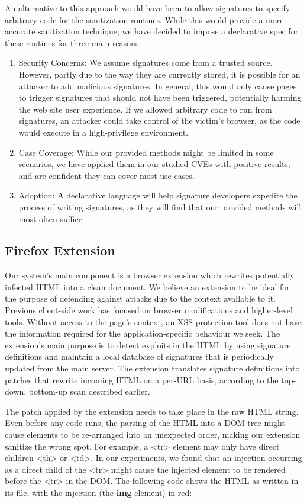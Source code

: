  An alternative to this approach would have been to allow signatures to specify arbitrary code for the sanitization routines. While this would provide a more accurate sanitization technique, we have decided to impose a declarative spec for these routines for three main reasons:
\begin{enumerate} 
	\item Security Concerns: We assume signatures come from a trusted source. However, partly due to the way they are currently stored, it is possible for an attacker to add malicious signatures. In general, this would only cause pages to trigger signatures that should not have been triggered, potentially harming the web site user experience. If we allowed arbitrary code to run from signatures, an attacker could take control of the victim's browser, as the code would execute in a high-privilege environment.
	\item Case Coverage: While our provided methods might be limited in some scenarios, we have applied them in our studied CVEs with positive results, and are confident they can cover most use cases.
	\item Adoption: A declarative language will help signature developers expedite the process of writing signatures, as they will find that our provided methods will most often suffice.
\end{enumerate}
 
 \subsection{Firefox Extension} \label{firefox_extension}
 Our system's main component is a browser extension which rewrites potentially infected HTML into a clean document. We believe an extension to be ideal for the purpose of defending against attacks due to the context available to it. Previous client-side work has focused on browser modifications and higher-level tools. Without access to the page's context, an XSS protection tool does not have the information required for the application-specific behaviour we seek. The extension's main purpose is to detect exploits in the HTML by using signature definitions and maintain a local database of signatures that is periodically updated from the main server. The extension translates signature definitions into patches that rewrite incoming HTML on a per-URL basis, according to the top-down, bottom-up scan described earlier. 

The patch applied by the extension needs to take place in the raw HTML string. Even before any code runs, the parsing of the HTML into a DOM tree might cause elements to be re-arranged into an unexpected order, making our extension sanitize the wrong spot. For example, a <tr> element may only have direct children <th> or <td>. In our experiments, we found that an injection occurring as a direct child of the <tr> might cause the injected element to be rendered before the <tr> in the DOM. The following code shows the HTML as written in its file, with the injection (the \textbf{img} element) in red:

